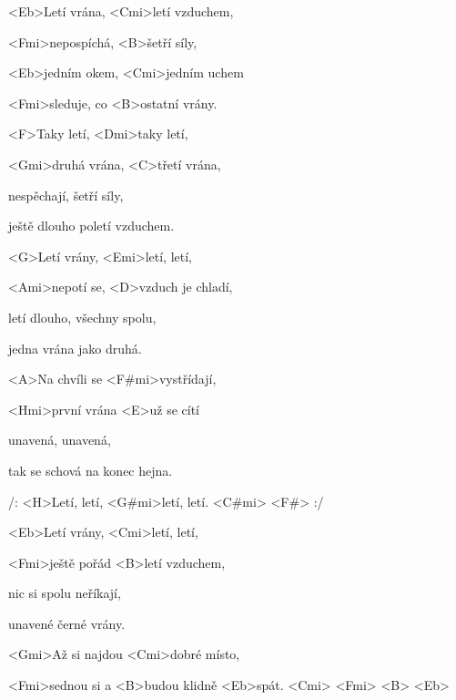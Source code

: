 

\zs
<Eb>Letí vrána, <Cmi>letí vzduchem,

<Fmi>nepospíchá, <B>šetří síly,

<Eb>jedním okem, <Cmi>jedním uchem

<Fmi>sleduje, co <B>ostatní vrány.
\ks

\zs
<F>Taky letí, <Dmi>taky letí,

<Gmi>druhá vrána, <C>třetí vrána,

nespěchají, šetří síly,

ještě dlouho poletí vzduchem.
\ks

\zs
<G>Letí vrány, <Emi>letí, letí,

<Ami>nepotí se, <D>vzduch je chladí,

letí dlouho, všechny spolu,

jedna vrána jako druhá.
\ks

\zs
<A>Na chvíli se <F#mi>vystřídají,

<Hmi>první vrána <E>už se cítí

unavená, unavená,

tak se schová na konec hejna.
\ks

\zr
/: <H>Letí, letí, <G#mi>letí, letí. <C#mi> <F#> :/
\kr

\zs
<Eb>Letí vrány, <Cmi>letí, letí,

<Fmi>ještě pořád <B>letí vzduchem,

nic si spolu neříkají,

unavené černé vrány.
\ks

\zr
<Gmi>Až si najdou <Cmi>dobré místo,

<Fmi>sednou si a <B>budou klidně <Eb>spát. <Cmi> 
<Fmi> <B> <Eb>
\kr

\kp
